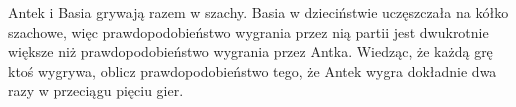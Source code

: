 Antek i Basia grywają razem w szachy. Basia w dzieciństwie uczęszczała na kółko szachowe, więc prawdopodobieństwo wygrania przez nią partii jest dwukrotnie większe niż prawdopodobieństwo wygrania przez Antka. Wiedząc, że każdą grę ktoś wygrywa, oblicz prawdopodobieństwo tego, że Antek wygra dokładnie dwa razy w przeciągu pięciu gier.